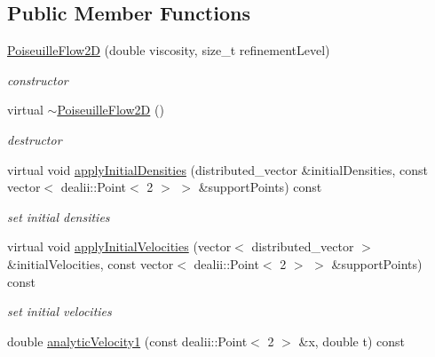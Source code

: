 \subsection*{Public Member Functions}
\begin{DoxyCompactItemize}
\item 
\hyperlink{classnatrium_1_1PoiseuilleFlow2D_a1834e3440ac19a8734f9133cd577e0ca}{Poiseuille\-Flow2\-D} (double viscosity, size\-\_\-t refinement\-Level)
\begin{DoxyCompactList}\small\item\em constructor \end{DoxyCompactList}\item 
\hypertarget{classnatrium_1_1PoiseuilleFlow2D_a62f9e7cfb2e32753b58eafb9d5936fd4}{virtual \hyperlink{classnatrium_1_1PoiseuilleFlow2D_a62f9e7cfb2e32753b58eafb9d5936fd4}{$\sim$\-Poiseuille\-Flow2\-D} ()}\label{classnatrium_1_1PoiseuilleFlow2D_a62f9e7cfb2e32753b58eafb9d5936fd4}

\begin{DoxyCompactList}\small\item\em destructor \end{DoxyCompactList}\item 
virtual void \hyperlink{classnatrium_1_1PoiseuilleFlow2D_abeeaed38da5f7e4fc4c299815fa850e7}{apply\-Initial\-Densities} (distributed\-\_\-vector \&initial\-Densities, const vector$<$ dealii\-::\-Point$<$ 2 $>$ $>$ \&support\-Points) const 
\begin{DoxyCompactList}\small\item\em set initial densities \end{DoxyCompactList}\item 
virtual void \hyperlink{classnatrium_1_1PoiseuilleFlow2D_a638b6505cc7aba17c69a04005ebf91eb}{apply\-Initial\-Velocities} (vector$<$ distributed\-\_\-vector $>$ \&initial\-Velocities, const vector$<$ dealii\-::\-Point$<$ 2 $>$ $>$ \&support\-Points) const 
\begin{DoxyCompactList}\small\item\em set initial velocities \end{DoxyCompactList}\item 
\hypertarget{classnatrium_1_1PoiseuilleFlow2D_a7900b79dac4dc5c120d9a04d9d4138ac}{double \hyperlink{classnatrium_1_1PoiseuilleFlow2D_a7900b79dac4dc5c120d9a04d9d4138ac}{analytic\-Velocity1} (const dealii\-::\-Point$<$ 2 $>$ \&x, double t) const }\label{classnatrium_1_1PoiseuilleFlow2D_a7900b79dac4dc5c120d9a04d9d4138ac}


\end{DoxyCompactItemize}
